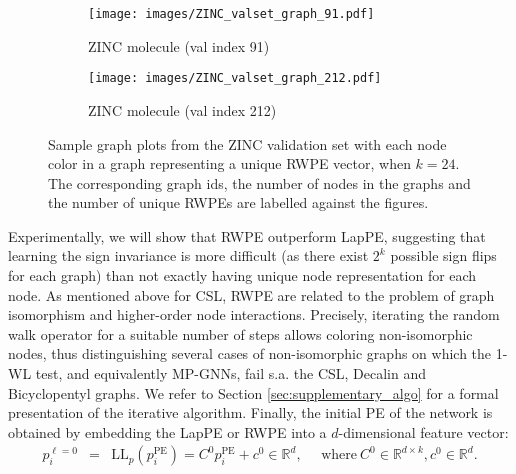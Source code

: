 \documentclass{article} \usepackage{iclr2021_conference,times}
\begin{document}
\begin{figure}[!t]
\centering
  \begin{subfigure}{0.36\linewidth}
  \centering
    \texttt{[image: images/ZINC\_valset\_graph\_91.pdf]}
    \vspace{-14pt}
    \caption{ZINC molecule (val index 91)}
    \label{fig:graph_id_91}
  \end{subfigure}
\begin{subfigure}{0.36\linewidth}
  \centering
    \texttt{[image: images/ZINC\_valset\_graph\_212.pdf]}
    \vspace{-14pt}
    \caption{ZINC molecule (val index 212)}
    \label{fig:graph_id_212}
  \end{subfigure}
  \vspace{-5pt}
  \caption{Sample graph plots from the ZINC validation set with each node color in a graph representing a unique RWPE vector, when $k=24$. The corresponding graph ids, the number of nodes in the graphs and the number of unique RWPEs are labelled against the figures.}
  \label{fig:uniqueness_RWPE_graphs_main}
\end{figure}




Experimentally, we will show that RWPE outperform LapPE, suggesting that learning the sign invariance is more difficult (as there exist $2^k$ possible sign flips for each graph) than not exactly having unique node representation for each node. As mentioned above for CSL, RWPE are related to the problem of graph isomorphism and higher-order node interactions. Precisely, iterating the random walk operator for a suitable number of steps allows coloring non-isomorphic nodes, thus distinguishing several cases of non-isomorphic graphs on which the 1-WL test, and equivalently MP-GNNs, fail s.a. the CSL, Decalin and Bicyclopentyl graphs. We refer to Section \ref{sec:supplementary_algo} for a formal presentation of the iterative algorithm. Finally, the initial PE of the network is obtained by embedding the LapPE or RWPE into a $d$-dimensional feature vector:
\begin{eqnarray}
    p_i^{\ell=0} &=& \textrm{LL}_p (p_i^\textrm{PE}) = C^0 p_i^\textrm{PE} + c^0 \in\mathbb{R}^{d}, \ \ \ \ \ \ \text{where} \ C^0 \in \mathbb{R}^{d \times k}, c^0 \in \mathbb{R}^d.
    \label{eqn:init_pe}
\end{eqnarray}
\end{document}
